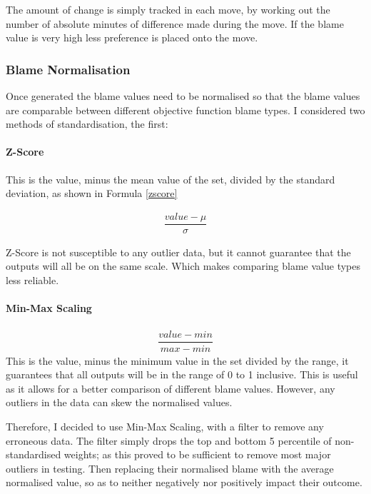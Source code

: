 \documentclass{article}
\begin{document}
The amount of change is simply tracked in each move, by working out the number of absolute minutes of difference made during the move. If the blame value is very high less preference is placed onto the move.



\subsubsection{Blame Normalisation}

\par
Once generated the blame values need to be normalised so that the blame values are comparable between different objective function blame types. I considered two methods of standardisation, the first:

\paragraph{Z-Score}

This is the value, minus the mean value of the set, divided by the standard deviation, as shown in Formula \ref{zscore}

\begin{gather}
	\label{zscore}
	\dfrac{value - \mu }{\sigma}
\end{gather}

Z-Score is not susceptible to any outlier data, but it cannot guarantee that the outputs will all be on the same scale. Which makes comparing blame value types less reliable. 

\paragraph{Min-Max Scaling}


\begin{gather}
\dfrac{value - min }{max - min}
\end{gather}
This is the value, minus the minimum value in the set divided by the range, it guarantees that all outputs will be in the range of 0 to 1 inclusive. This is useful as it allows for a better comparison of different blame values. However, any outliers in the data can skew the normalised values.

\par 
Therefore, I decided to use Min-Max Scaling, with a filter to remove any erroneous data. The filter simply drops the top and bottom 5 percentile of non-standardised weights; as this proved to be sufficient to remove most major outliers in testing. Then replacing their normalised blame with the average normalised value, so as to neither negatively nor positively impact their outcome. 
\end{document}
